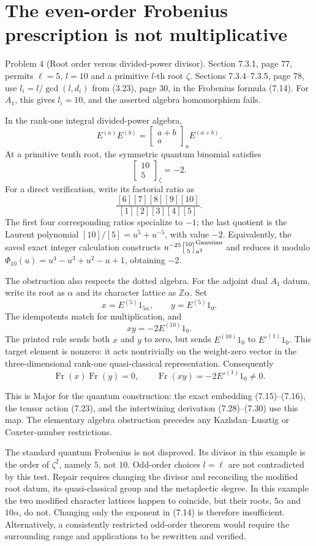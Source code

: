 \documentclass[10pt]{article}
\begin{document}
\section*{The even-order Frobenius prescription is not multiplicative}
Problem 4 (Root order versus divided-power divisor).  Section 7.3.1, page 77, permits \(\ell=5\), \(l=10\) and a primitive \(l\)-th root \(\zeta\). Sections 7.3.4–7.3.5, page 78, use \(l_i=l/\gcd(l,d_i)\) from (3.23), page 30, in the Frobenius formula (7.14). For \(A_1\), this gives \(l_i=10\), and the asserted algebra homomorphism fails.\par
In the rank-one integral divided-power algebra, \[E^{(a)}E^{(b)}=
 \begin{bmatrix}a+b\\a\end{bmatrix}_{u}E^{(a+b)}.\] At a primitive tenth root, the symmetric quantum binomial satisfies \[\begin{bmatrix}10\\5\end{bmatrix}_{\zeta}=-2.\] For a direct verification, write its factorial ratio as \[\frac{[6][7][8][9][10]}{[1][2][3][4][5]}.\] The first four corresponding ratios specialize to \(-1\); the last quotient is the Laurent polynomial \([10]/[5]=u^5+u^{-5}\), with value \(-2\). Equivalently, the saved exact integer calculation constructs \(u^{-25}{10\brack5}_{u^2}^{\rm Gaussian}\) and reduces it modulo \(\Phi_{10}(u)=u^4-u^3+u^2-u+1\), obtaining \(-2\).\par
The obstruction also respects the dotted algebra. For the adjoint dual \(A_1\) datum, write its root as \(\alpha\) and its character lattice as \(\mathbb Z\alpha\). Set \[x=E^{(5)}1_{5\alpha},\qquad y=E^{(5)}1_0.\] The idempotents match for multiplication, and \[xy=-2E^{(10)}1_0.\] The printed rule sends both \(x\) and \(y\) to zero, but sends \(E^{(10)}1_0\) to \(E'^{(1)}1_0\). This target element is nonzero: it acts nontrivially on the weight-zero vector in the three-dimensional rank-one quasi-classical representation. Consequently \[\operatorname{Fr}(x)\operatorname{Fr}(y)=0,\qquad
 \operatorname{Fr}(xy)=-2E'^{(1)}1_0\ne0.\]\par
This is Major for the quantum construction: the exact embedding (7.15)–(7.16), the tensor action (7.23), and the intertwining derivation (7.28)–(7.30) use this map. The elementary algebra obstruction precedes any Kazhdan–Lusztig or Coxeter-number restrictions.\par
The standard quantum Frobenius is not disproved. Its divisor in this example is the order of \(\zeta^2\), namely \(5\), not \(10\). Odd-order choices \(l=\ell\) are not contradicted by this test. Repair requires changing the divisor and reconciling the modified root datum, its quasi-classical group and the metaplectic degree. In this example the two modified character lattices happen to coincide, but their roots, \(5\alpha\) and \(10\alpha\), do not. Changing only the exponent in (7.14) is therefore insufficient. Alternatively, a consistently restricted odd-order theorem would require the surrounding range and applications to be rewritten and verified.\par
\end{document}

